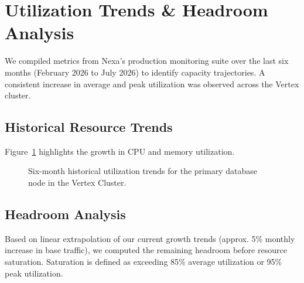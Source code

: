 \section{Utilization Trends \& Headroom Analysis}
We compiled metrics from Nexa's production monitoring suite over the last six months (February 2026 to July 2026) to identify capacity trajectories. A consistent increase in average and peak utilization was observed across the Vertex cluster.

\subsection{Historical Resource Trends}
Figure~\ref{fig:utilization_trends} highlights the growth in CPU and memory utilization.

\begin{figure}[htbp]
  \centering
  \caption{Six-month historical utilization trends for the primary database node in the Vertex Cluster.}
  \label{fig:utilization_trends}
\end{figure}

\subsection{Headroom Analysis}
Based on linear extrapolation of our current growth trends (approx. 5\% monthly increase in base traffic), we computed the remaining headroom before resource saturation. Saturation is defined as exceeding 85\% average utilization or 95\% peak utilization.

